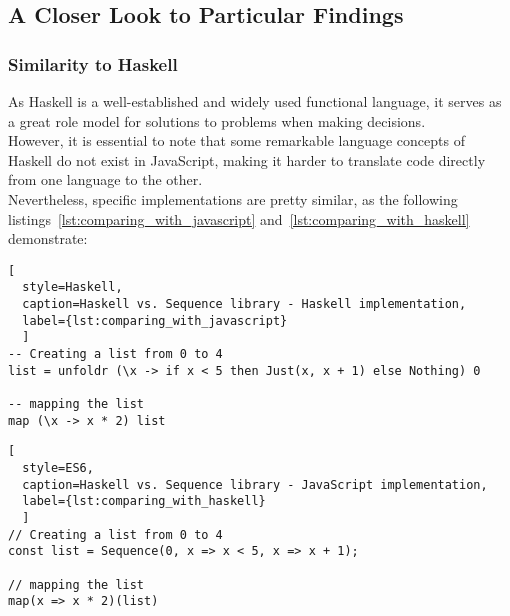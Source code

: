 \subsection{A Closer Look to Particular Findings}
\label{sub:A Closer Look to Particular Findings}

\subsubsection{Similarity to Haskell}
\label{subsub:Similarity to Haskell}
As Haskell is a well-established and widely used functional language, it serves
as a great role model for solutions to problems when making decisions. \\
However, it is essential to note that some remarkable language concepts of
Haskell do not exist in JavaScript, making it harder to translate code directly
from one language to the other.\\
Nevertheless, specific implementations are
pretty similar, as the following listings~\ref{lst:comparing_with_javascript}
and~\ref{lst:comparing_with_haskell} demonstrate:

\begin{lstlisting}[
  style=Haskell, 
  caption=Haskell vs. Sequence library - Haskell implementation, 
  label={lst:comparing_with_javascript}
  ]
-- Creating a list from 0 to 4
list = unfoldr (\x -> if x < 5 then Just(x, x + 1) else Nothing) 0

-- mapping the list
map (\x -> x * 2) list 
\end{lstlisting}

\begin{lstlisting}[
  style=ES6, 
  caption=Haskell vs. Sequence library - JavaScript implementation,
  label={lst:comparing_with_haskell}
  ]
// Creating a list from 0 to 4
const list = Sequence(0, x => x < 5, x => x + 1);

// mapping the list
map(x => x * 2)(list)
\end{lstlisting}
